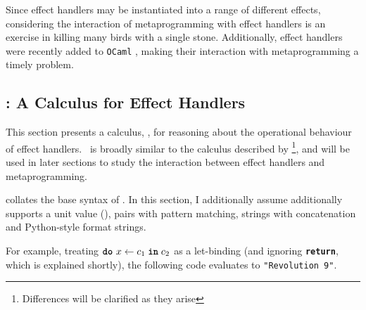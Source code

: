 


Since effect handlers may be instantiated into a range of different effects, considering the interaction of metaprogramming with effect handlers is an exercise in killing many birds with a single stone. Additionally, effect handlers were recently added to \texttt{OCaml} \citep{sivaramakrishnan-21}, making their interaction with metaprogramming a timely problem. 
\subsection{\texorpdfstring{\efflang{}}{Lambda-Op}: A Calculus for Effect Handlers}\label{subsection:effect-handler-calculus}
\newcommand{\print}[1]{\texttt{\textbf{print}}(\texttt{#1})}
\newcommand{\readInt}[1]{\texttt{\textbf{read\_int}(#1)}}


This section presents a calculus, \efflang{}, for reasoning about the operational behaviour of effect handlers.\ \efflang{} is broadly similar to the calculus described by \citet{pretnar-15} \footnote{Differences will be clarified as they arise}, and will be used in later sections to study the interaction between effect handlers and metaprogramming. 


 collates the base syntax of \efflang. In this section, I additionally assume \efflang{} additionally supports a unit value (), pairs with pattern matching, strings with concatenation and Python-style format strings. 

For example, treating $\texttt{\textbf{do}} \,\, {x} \leftarrow {c_1} \; \textbf{\texttt{in}} \; {c_2}$ as a let-binding (and ignoring \textbf{\texttt{return}}, which is explained shortly), the following code evaluates to \texttt{"Revolution 9"}.

